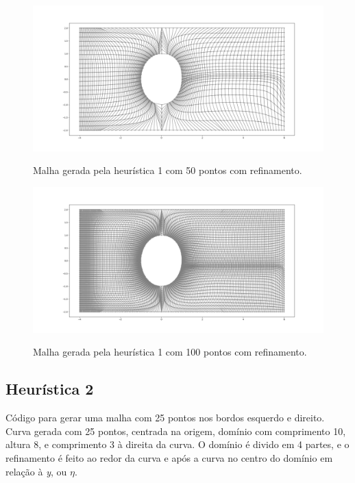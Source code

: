 \documentclass[a4paper]{article}
\begin{document}
\begin{figure}[H]
	\centering
	\includegraphics[width=1.0\textwidth]{heuristica_1_50pts_refined.png}
	\label{fig:heuristic1_50pts_refined} 
	\caption[caption]{Malha gerada pela heurística 1 com 50 pontos com refinamento.}
\end{figure}

\begin{figure}[H]
	\centering
	\includegraphics[width=1.0\textwidth]{heuristica_1_100pts_refined.png}
	\label{fig:heuristic1_100pts_refined} 
	\caption[caption]{Malha gerada pela heurística 1 com 100 pontos com refinamento.}
\end{figure}






\subsection{Heurística 2}



Código para gerar uma malha com 25 pontos nos bordos esquerdo e direito. Curva gerada com 25 pontos, centrada na origem, domínio com comprimento 10, altura 8, e comprimento 3 à direita da curva. O domínio é divido em 4 partes, e o refinamento é feito ao redor da curva e após a curva no centro do domínio em relação à \textit{y}, ou $\eta$.
\end{document}
